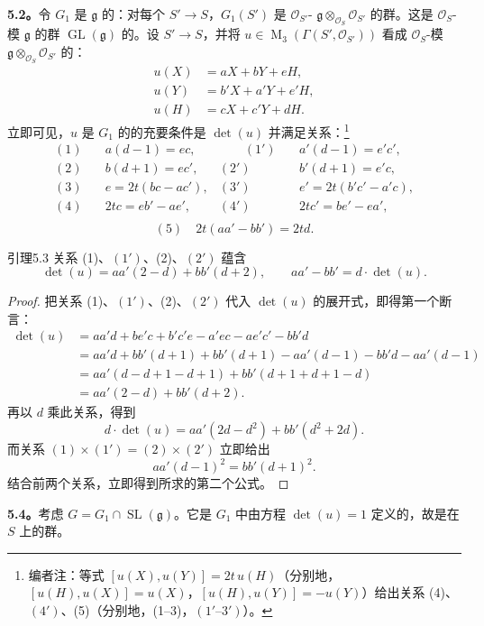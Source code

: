\textbf{5.2。}令 $G_1$ 是 $\mathfrak g$ 的：对每个 $S'\to S$，$G_1(S')$ 是 $\mathscr O_{S'}$- $\mathfrak g\otimes_{\mathscr O_S}\mathscr O_{S'}$ 的群。这是 $\mathscr O_S$-模 $\mathfrak g$ 的群 $\operatorname{GL}(\mathfrak g)$ 的。设 $S'\to S$，并将 $u\in\operatorname M_3(\Gamma(S',\mathscr O_{S'}))$ 看成 $\mathscr O_S$-模 $\mathfrak g\otimes_{\mathscr O_S}\mathscr O_{S'}$ 的：
\begin{align*}
u(X)&=aX+bY+eH,\\
u(Y)&=b'X+a'Y+e'H,\\
u(H)&=cX+c'Y+dH.
\end{align*}
立即可见，$u$ 是 $G_1$ 的的充要条件是 $\det(u)$ 并满足关系：\footnote[37]{编者注：等式 $[u(X),u(Y)]=2t\,u(H)$（分别地，$[u(H),u(X)]=u(X)$，$[u(H),u(Y)]=-u(Y)$）给出关系 (4)、$(4')$、(5)（分别地，(1--3)，$(1'\text{--}3')$）。}
\[
\begin{alignedat}{3}
(1)\quad&a(d-1)=ec,&\qquad(1')\quad&a'(d-1)=e'c',\\
(2)\quad&b(d+1)=ec',& (2')\quad&b'(d+1)=e'c,\\
(3)\quad&e=2t(bc-ac'),& (3')\quad&e'=2t(b'c'-a'c),\\
(4)\quad&2tc=eb'-ae',& (4')\quad&2tc'=be'-ea',\\
\end{alignedat}
\]
\[
(5)\quad2t(aa'-bb')=2td.
\]
\begin{SGAresult}{引理}{5.3}
关系 (1)、$(1')$、(2)、$(2')$ 蕴含
\[
\det(u)=aa'(2-d)+bb'(d+2),\qquad aa'-bb'=d\cdot\det(u).
\]
\end{SGAresult}
\begin{proof}
把关系 (1)、$(1')$、(2)、$(2')$ 代入 $\det(u)$ 的展开式，即得第一个断言：
\begin{align*}
\det(u)&=aa'd+be'c+b'c'e-a'ec-ae'c'-bb'd\\
&=aa'd+bb'(d+1)+bb'(d+1)-aa'(d-1)-bb'd-aa'(d-1)\\
&=aa'(d-d+1-d+1)+bb'(d+1+d+1-d)\\
&=aa'(2-d)+bb'(d+2).
\end{align*}
再以 $d$ 乘此关系，得到
\[
d\cdot\det(u)=aa'(2d-d^2)+bb'(d^2+2d).
\]
而关系 $(1)\times(1')=(2)\times(2')$ 立即给出
\[
aa'(d-1)^2=bb'(d+1)^2.
\]
结合前两个关系，立即得到所求的第二个公式。
\end{proof}
\textbf{5.4。}考虑 $G=G_1\cap\operatorname{SL}(\mathfrak g)$。它是 $G_1$ 中由方程 $\det(u)=1$ 定义的，故是在 $S$ 上的群。
